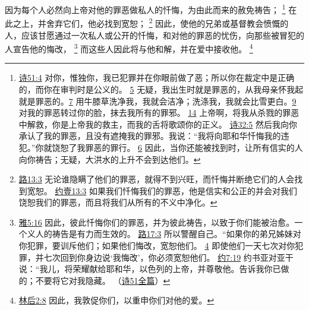\documentclass[12pt, a4paper, oneside]{ctexart}
\newcounter{parnum}[section]
\newcommand{\N}{%
   \noindent\refstepcounter{parnum}%
    \makebox[\parindent][l]{\textbf{\arabic{parnum}.}}}
\begin{document}
\N 因为每个人必然向上帝对他的罪恶做私人的忏悔，为由此而来的赦免祷告；
	\footnote {
		\href{https://biblehub.com/psalms/51-4.htm}{诗51:4} 对你，惟独你，我已犯罪并在你眼前做了恶；所以你在裁定中是正确的，而你在审判时是公义的。
		\href{https://biblehub.com/psalms/51-5.htm}{5} 无疑，我出生时就是罪恶的，从我母亲怀我起就是罪恶的。\href{https://biblehub.com/psalms/51-7.htm}{7} 用牛膝草洗净我，我就会洁净；洗涤我，我就会比雪更白。\href{https://biblehub.com/psalms/51-9.htm}{9} 对我的罪恶转过你的脸，抹去我所有的罪邪。
		\href{https://biblehub.com/psalms/51-14.htm}{14} 上帝啊，将我从杀戮的罪恶中解救，你是上帝我的救主，而我的舌将歌颂你的正义。
		\href{https://biblehub.com/psalms/32-5.htm}{诗32:5} 然后我向你承认了我的罪恶，且没有遮掩我的罪邪。我说：“我将向耶和华忏悔我的违犯。”你就饶恕了我罪恶的罪行。
		\href{https://biblehub.com/psalms/32-6.htm}{6} 因此，当你还能被找到时，让所有信实的人向你祷告；无疑，大洪水的上升不会到达他们。
	}
	在此之上，并舍弃它们，他必找到宽恕；
	\footnote {
		\href{https://biblehub.com/proverbs/28-13.htm}{路13:3} 无论谁隐瞒了他们的罪恶，就得不到兴旺，而忏悔并断绝它们的人会找到宽恕。
		\href{https://biblehub.com/1_john/1-9.htm}{约壹13:3} 如果我们忏悔我们的罪恶，他是信实和公正的并会对我们饶恕我们的罪恶，而且将我们从所有的不义中净化。
	}
	因此，使他的兄弟或基督教会愤慨的人，应该甘愿通过一次私人或公开的忏悔，和对他的罪恶的忧伤，向那些被冒犯的人宣告他的悔改，
	\footnote {
		\href{https://biblehub.com/james/5-16.htm}{雅5:16} 因此，彼此忏悔你们的罪恶，并为彼此祷告，以致于你们能被治愈。一个义人的祷告是有力而生效的。
		\href{https://biblehub.com/luke/17-3.htm}{路17:3} 所以警醒自己。“如果你的弟兄姊妹对你犯罪，要训斥他们；如果他们悔改，宽恕他们。
		\href{https://biblehub.com/luke/17-4.htm}{4} 即使他们一天七次对你犯罪，并七次回到你身边说‘我悔改’，你必须宽恕他们。
		\href{https://biblehub.com/joshua/7-19.htm}{约7:19} 约书亚对亚干说：“我儿，将荣耀献给耶和华，以色列的上帝，并尊敬他。告诉我你已做的；不要将它对我隐藏。
		（\href{https://biblehub.com/niv/psalms/51.htm}{诗51全篇}）
	}
	而这些人因此将与他和解，并在爱中接收他。
	\footnote {
		\href{https://biblehub.com/2_corinthians/2-8.htm}{林后2:8} 因此，我敦促你们，以重申你们对他的爱。
	}
\end{document}
